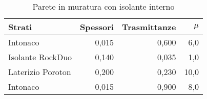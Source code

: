 \begin{table}[H]
\centering
\caption{Parete in muratura con isolante interno}
\begin{tabular}{lrrr}
\toprule
            Strati & Spessori & Trasmittanze & $\mu$ 		  \\
\midrule
          Intonaco &    0,015 &        0,600 &           6,0  \\
  Isolante RockDuo &    0,140 &        0,035 &           1,0  \\
 Laterizio Poroton &    0,200 &        0,230 &          10,0  \\
          Intonaco &    0,015 &        0,900 &           8,0  \\
\bottomrule
\end{tabular}
\end{table}

